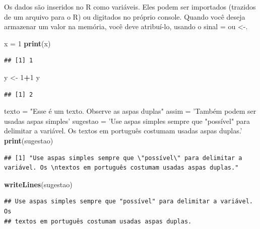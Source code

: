 \documentclass[
]{book}
\newenvironment{Shaded}{\begin{snugshade}}{\end{snugshade}}
\newcommand{\DecValTok}[1]{\textcolor[rgb]{0.00,0.00,0.81}{#1}}
\newcommand{\KeywordTok}[1]{\textcolor[rgb]{0.13,0.29,0.53}{\textbf{#1}}}
\newcommand{\NormalTok}[1]{#1}
\newcommand{\OperatorTok}[1]{\textcolor[rgb]{0.81,0.36,0.00}{\textbf{#1}}}
\newcommand{\StringTok}[1]{\textcolor[rgb]{0.31,0.60,0.02}{#1}}
\begin{document}
Os dados são inseridos no R como variáveis. Eles podem ser importados (trazidos de um arquivo para o R) ou digitados no próprio console. Quando você deseja armazenar um valor na memória, você deve atribuí-lo, usando o sinal = ou \textless-.

\begin{Shaded}
\begin{Highlighting}[]
\NormalTok{x =}\StringTok{ }\DecValTok{1}
\KeywordTok{print}\NormalTok{(x)}
\end{Highlighting}
\end{Shaded}

\begin{verbatim}
## [1] 1
\end{verbatim}

\begin{Shaded}
\begin{Highlighting}[]
\NormalTok{y <-}\StringTok{ }\DecValTok{1}\OperatorTok{+}\DecValTok{1}
\NormalTok{y}
\end{Highlighting}
\end{Shaded}

\begin{verbatim}
## [1] 2
\end{verbatim}

\begin{Shaded}
\begin{Highlighting}[]
\NormalTok{texto =}\StringTok{ "Esse é um texto. Observe as aspas duplas"}
\NormalTok{assim =}\StringTok{ 'Também podem ser usadas aspas simples'}
\NormalTok{sugestao =}\StringTok{ 'Use aspas simples sempre que "possível" para delimitar a variável. Os }
\StringTok{textos em português costumam usadas aspas duplas.'}
\KeywordTok{print}\NormalTok{(sugestao)}
\end{Highlighting}
\end{Shaded}

\begin{verbatim}
## [1] "Use aspas simples sempre que \"possível\" para delimitar a variável. Os \ntextos em português costumam usadas aspas duplas."
\end{verbatim}

\begin{Shaded}
\begin{Highlighting}[]
\KeywordTok{writeLines}\NormalTok{(sugestao)}
\end{Highlighting}
\end{Shaded}

\begin{verbatim}
## Use aspas simples sempre que "possível" para delimitar a variável. Os 
## textos em português costumam usadas aspas duplas.
\end{verbatim}
\end{document}
